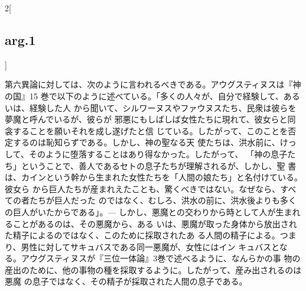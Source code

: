 \documentclass[paper=a4paper,fontsize=10pt,jafontsize=9pt,titlepage]{jlreq}
\begin{document}
\begin{paracol}{2}[\subsection{arg.1}]
\switchcolumn

第六異論に対しては、次のように言われるべきである。アウグスティヌスは『神の国』15
巻で以下のように述べている。「多くの人々が、自分で経験して、あるいは、経験した人
から聞いて、シルワーヌスやファウヌスたち、民衆は彼らを夢魔と呼んでいるが、彼らが
邪悪にもしばしば女性たちに現れて、彼女らと同衾することを願いそれを成し遂げたと信
じている。したがって、このことを否定するのは恥知らずである。しかし、神の聖なる天
使たちは、洪水前に、けっして、そのように堕落することはあり得なかった。したがって、
「神の息子たち」ということで、善人であるセトの息子たちが理解されるが、しかし、聖
書は、カインという幹から生まれた女性たちを「人間の娘たち」と名付けている。彼女ら
から巨人たちが産まれえたことも、驚くべきではない。なぜなら、すべての者たちが巨人だった
のではなく、むしろ、洪水の前に、洪水後よりも多くの巨人がいたからである」。---
しかし、悪魔との交わりから時として人が生まれることがあるのは、その悪魔から、ある
いは、悪魔が取った身体から放出された精子によるのではなく、このために採取されたあ
る人間の精子による。つまり、男性に対してサキュバスである同一悪魔が、女性にはイン
キュバスとなる。アウグスティヌスが『三位一体論』3巻で述べるように、なんらかの事
物の産出のために、他の事物の種を採取するように。したがって、産み出されるのは悪魔
の息子ではなく、その精子が採取された人間の息子である。

\end{paracol}
\end{document}
